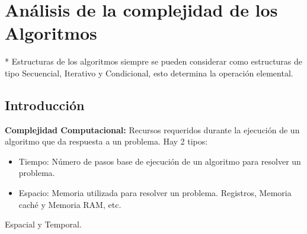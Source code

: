 \chapter{Análisis de la complejidad de los Algoritmos}\label{ch:análisis-de-la-complejidad-de-los-algoritmos}

* Estructuras de los algoritmos siempre se pueden considerar como estructuras de tipo Secuencial, Iterativo y Condicional, esto determina la operación elemental.

\section{Introducción}\label{sec:introduccion}
\textbf{Complejidad Computacional:} Recursos requeridos durante la ejecución de un algoritmo que da respuesta a un problema. Hay 2 tipos:
\begin{itemize}
  \item Tiempo: Número de pasos base de ejecución de un algoritmo para resolver un problema.
  \item Espacio: Memoria utilizada para resolver un problema. Registros, Memoria caché y Memoria RAM, etc.
\end{itemize}
Espacial y Temporal.

